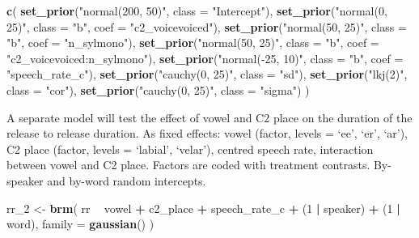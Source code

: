 \documentclass[11pt,]{article}
\newenvironment{Shaded}{\begin{snugshade}}{\end{snugshade}}
\newcommand{\KeywordTok}[1]{\textcolor[rgb]{0.13,0.29,0.53}{\textbf{#1}}}
\newcommand{\DataTypeTok}[1]{\textcolor[rgb]{0.13,0.29,0.53}{#1}}
\newcommand{\DecValTok}[1]{\textcolor[rgb]{0.00,0.00,0.81}{#1}}
\newcommand{\StringTok}[1]{\textcolor[rgb]{0.31,0.60,0.02}{#1}}
\newcommand{\OperatorTok}[1]{\textcolor[rgb]{0.81,0.36,0.00}{\textbf{#1}}}
\newcommand{\NormalTok}[1]{#1}
\begin{document}
\begin{Shaded}
\begin{Highlighting}[]
\KeywordTok{c}\NormalTok{(}
  \KeywordTok{set_prior}\NormalTok{(}\StringTok{"normal(200, 50)"}\NormalTok{, }\DataTypeTok{class =} \StringTok{"Intercept"}\NormalTok{),}
  \KeywordTok{set_prior}\NormalTok{(}\StringTok{"normal(0, 25)"}\NormalTok{, }\DataTypeTok{class =} \StringTok{"b"}\NormalTok{, }\DataTypeTok{coef =} \StringTok{"c2_voicevoiced"}\NormalTok{),}
  \KeywordTok{set_prior}\NormalTok{(}\StringTok{"normal(50, 25)"}\NormalTok{, }\DataTypeTok{class =} \StringTok{"b"}\NormalTok{, }\DataTypeTok{coef =} \StringTok{"n_sylmono"}\NormalTok{),}
  \KeywordTok{set_prior}\NormalTok{(}\StringTok{"normal(50, 25)"}\NormalTok{, }\DataTypeTok{class =} \StringTok{"b"}\NormalTok{, }\DataTypeTok{coef =} \StringTok{"c2_voicevoiced:n_sylmono"}\NormalTok{),}
  \KeywordTok{set_prior}\NormalTok{(}\StringTok{"normal(-25, 10)"}\NormalTok{, }\DataTypeTok{class =} \StringTok{"b"}\NormalTok{, }\DataTypeTok{coef =} \StringTok{"speech_rate_c"}\NormalTok{),}
  \KeywordTok{set_prior}\NormalTok{(}\StringTok{"cauchy(0, 25)"}\NormalTok{, }\DataTypeTok{class =} \StringTok{"sd"}\NormalTok{),}
  \KeywordTok{set_prior}\NormalTok{(}\StringTok{"lkj(2)"}\NormalTok{, }\DataTypeTok{class =} \StringTok{"cor"}\NormalTok{),}
  \KeywordTok{set_prior}\NormalTok{(}\StringTok{"cauchy(0, 25)"}\NormalTok{, }\DataTypeTok{class =} \StringTok{"sigma"}\NormalTok{)}
\NormalTok{)}
\end{Highlighting}
\end{Shaded}

A separate model will test the effect of vowel and C2 place on the
duration of the release to release duration. As fixed effects: vowel
(factor, levels = `ee', `er', `ar'), C2 place (factor, levels =
`labial', `velar'), centred speech rate, interaction between vowel and
C2 place. Factors are coded with treatment contrasts. By-speaker and
by-word random intercepts.

\begin{Shaded}
\begin{Highlighting}[]
\NormalTok{rr_}\DecValTok{2}\NormalTok{ <-}\StringTok{ }\KeywordTok{brm}\NormalTok{(}
\NormalTok{  rr }\OperatorTok{~}
\StringTok{    }\NormalTok{vowel }\OperatorTok{+}
\StringTok{    }\NormalTok{c2_place }\OperatorTok{+}
\StringTok{    }\NormalTok{speech_rate_c }\OperatorTok{+}
\StringTok{    }\NormalTok{(}\DecValTok{1} \OperatorTok{|}\StringTok{ }\NormalTok{speaker) }\OperatorTok{+}
\StringTok{    }\NormalTok{(}\DecValTok{1} \OperatorTok{|}\StringTok{ }\NormalTok{word),}
  \DataTypeTok{family =} \KeywordTok{gaussian}\NormalTok{()}
\NormalTok{)}
\end{Highlighting}
\end{Shaded}
\end{document}
